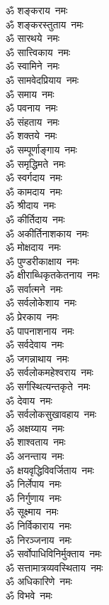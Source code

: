 \begin{multicols}{2}
\begin{flushleft}
ॐ शङ्कराय~नमः\\
ॐ शङ्करस्तुताय~नमः\\
ॐ सारथये~नमः\\
ॐ सात्त्विकाय~नमः\\
ॐ स्वामिने~नमः\\
ॐ सामवेदप्रियाय~नमः\hfill{}\\
ॐ समाय~नमः\\
ॐ पवनाय~नमः\\
ॐ संहताय~नमः\\
ॐ शक्तये~नमः\\
ॐ सम्पूर्णाङ्गाय~नमः\\
ॐ समृद्धिमते~नमः\\
ॐ स्वर्गदाय~नमः\\
ॐ कामदाय~नमः\\
ॐ श्रीदाय~नमः\\
ॐ कीर्तिदाय~नमः\hfill{}\\
ॐ अकीर्तिनाशकाय~नमः\\
ॐ मोक्षदाय~नमः\\
ॐ पुण्डरीकाक्षाय~नमः\\
ॐ क्षीराब्धिकृतकेतनाय~नमः\\
ॐ सर्वात्मने~नमः\\
ॐ सर्वलोकेशाय~नमः\\
ॐ प्रेरकाय~नमः\\
ॐ पापनाशनाय~नमः\\
ॐ सर्वदेवाय~नमः\\
ॐ जगन्नाथाय~नमः\hfill{}\\
ॐ सर्वलोकमहेश्वराय~नमः\\
ॐ सर्गस्थित्यन्तकृते~नमः\\
ॐ देवाय~नमः\\
ॐ सर्वलोकसुखावहाय~नमः\\
ॐ अक्षय्याय~नमः\\
ॐ शाश्वताय~नमः\\
ॐ अनन्ताय~नमः\\
ॐ क्षयवृद्धिविवर्जिताय~नमः\\
ॐ निर्लेपाय~नमः\\
ॐ निर्गुणाय~नमः\hfill{}\\
ॐ सूक्ष्माय~नमः\\
ॐ निर्विकाराय~नमः\\
ॐ निरञ्जनाय~नमः\\
ॐ सर्वोपाधिविनिर्मुक्ताय~नमः\\
ॐ सत्तामात्रव्यवस्थिताय~नमः\\
ॐ अधिकारिणे~नमः\\
ॐ विभवे~नमः\\

\end{flushleft}
\end{multicols}
